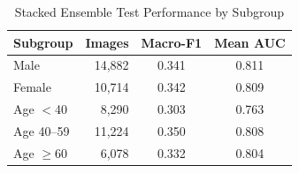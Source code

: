 \begin{table}[t]
\caption{Stacked Ensemble Test Performance by Subgroup}
\label{tab:subgroups}
\centering
\begin{tabular}{lrcc}
\toprule
Subgroup & Images & Macro-F1 & Mean AUC \\
\midrule
Male & 14,882 & 0.341 & 0.811 \\
Female & 10,714 & 0.342 & 0.809 \\
Age $<$40 & 8,290 & 0.303 & 0.763 \\
Age 40--59 & 11,224 & 0.350 & 0.808 \\
Age $\geq$60 & 6,078 & 0.332 & 0.804 \\
\bottomrule
\end{tabular}
\end{table}

